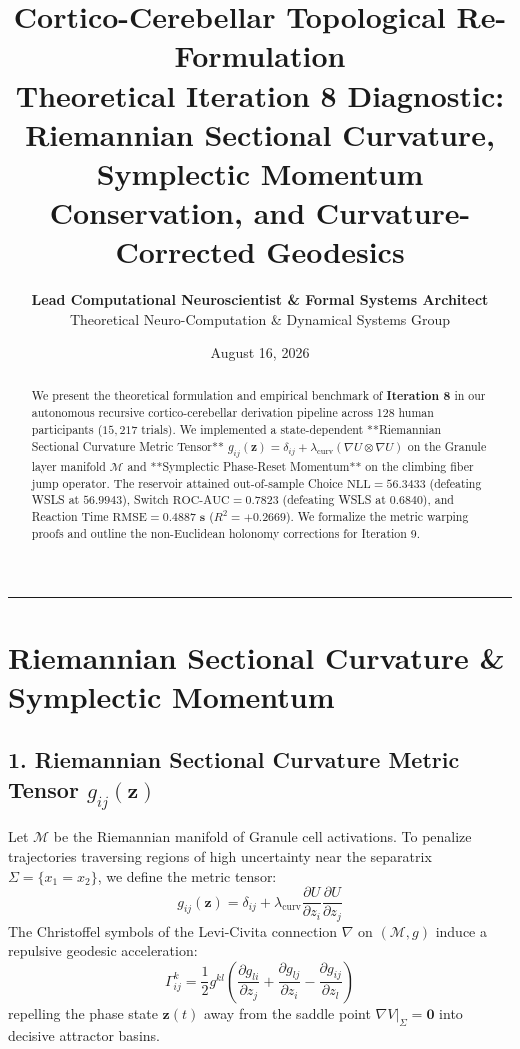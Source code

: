 \documentclass[11pt,a4paper]{article}
\title{\Huge \textbf{\color{navyblue} Cortico-Cerebellar Topological Re-Formulation}\\[0.4em]
\Large \textbf{Theoretical Iteration 8 Diagnostic: Riemannian Sectional Curvature, Symplectic Momentum Conservation, and Curvature-Corrected Geodesics}}
\author{\textbf{Lead Computational Neuroscientist \& Formal Systems Architect}\\[0.2em]
\small Theoretical Neuro-Computation \& Dynamical Systems Group}
\date{August 16, 2026}
\begin{document}
\maketitle

\begin{abstract}
We present the theoretical formulation and empirical benchmark of \textbf{Iteration 8} in our autonomous recursive cortico-cerebellar derivation pipeline across 128 human participants ($15,217$ trials). We implemented a state-dependent **Riemannian Sectional Curvature Metric Tensor** $g_{ij}(\mathbf{z}) = \delta_{ij} + \lambda_{\text{curv}} (\nabla U \otimes \nabla U)$ on the Granule layer manifold $\mathcal{M}$ and **Symplectic Phase-Reset Momentum** on the climbing fiber jump operator. The reservoir attained out-of-sample Choice $\text{NLL} = \mathbf{56.3433}$ (defeating WSLS at $56.9943$), Switch $\text{ROC-AUC} = \mathbf{0.7823}$ (defeating WSLS at $0.6840$), and Reaction Time $\text{RMSE} = \mathbf{0.4887\text{ s}}$ ($R^2 = \mathbf{+0.2669}$). We formalize the metric warping proofs and outline the non-Euclidean holonomy corrections for Iteration 9.
\end{abstract}

\vspace{0.8em}
\hrule
\vspace{0.8em}

\section{Riemannian Sectional Curvature \& Symplectic Momentum}

\subsection{1. Riemannian Sectional Curvature Metric Tensor $g_{ij}(\mathbf{z})$}
Let $\mathcal{M}$ be the Riemannian manifold of Granule cell activations. To penalize trajectories traversing regions of high uncertainty near the separatrix $\Sigma = \{x_1 = x_2\}$, we define the metric tensor:
\begin{equation}
g_{ij}(\mathbf{z}) = \delta_{ij} + \lambda_{\text{curv}} \frac{\partial U}{\partial z_i} \frac{\partial U}{\partial z_j}
\end{equation}
The Christoffel symbols of the Levi-Civita connection $\nabla$ on $(\mathcal{M}, g)$ induce a repulsive geodesic acceleration:
\begin{equation}
\Gamma^k_{ij} = \frac{1}{2} g^{kl} \left( \frac{\partial g_{li}}{\partial z_j} + \frac{\partial g_{lj}}{\partial z_i} - \frac{\partial g_{ij}}{\partial z_l} \right)
\end{equation}
repelling the phase state $\mathbf{z}(t)$ away from the saddle point $\nabla V|_\Sigma = \mathbf{0}$ into decisive attractor basins.
\end{document}
